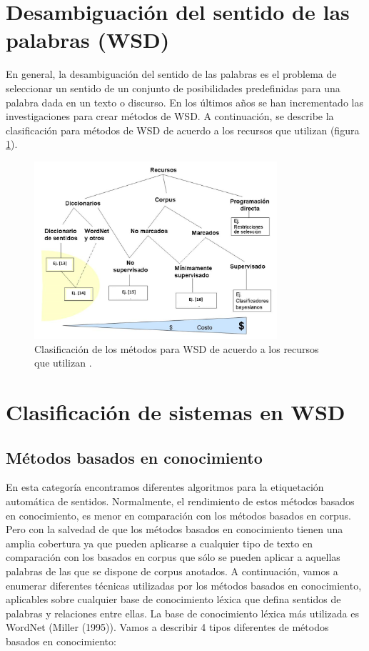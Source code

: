 \section{Desambiguación del sentido de las palabras (WSD)}
En general, la desambiguación del sentido de las palabras es el problema de seleccionar un sentido de un conjunto de posibilidades predefinidas para una palabra dada en un texto o discurso.
En los últimos años se han incrementado las investigaciones para crear métodos de WSD. A continuación, se describe la clasificación para métodos de WSD de acuerdo a los recursos que utilizan (figura \ref{fig:desambiguacion_WSD}).

  \begin{figure}[h!]
	  \begin{center}
    \includegraphics[angle=0, width=9cm]{Graficos/desambiguacion_WSD}
	  \caption{Clasificación de los métodos para WSD de acuerdo a los recursos que utilizan \cite{001}.}
    \label{fig:desambiguacion_WSD}
    \end{center}
	\end{figure}

\section{Clasificación de sistemas en WSD}
\subsection{Métodos basados en conocimiento}
En esta categoría encontramos diferentes algoritmos para la etiquetación automática de sentidos. Normalmente, el rendimiento de estos métodos basados en conocimiento, es menor en comparación con los métodos basados en corpus. Pero con la salvedad de que los métodos basados en conocimiento tienen una amplia cobertura ya que pueden aplicarse a cualquier tipo de texto en comparación con los basados en corpus que sólo se pueden aplicar a aquellas palabras de las que se dispone de corpus anotados. A continuación, vamos a enumerar diferentes técnicas utilizadas por los métodos basados en conocimiento, aplicables sobre cualquier base de conocimiento léxica que defina sentidos de palabras y relaciones entre ellas. La base de conocimiento léxica más utilizada es WordNet (Miller (1995)). Vamos a describir 4 tipos diferentes de métodos basados en conocimiento:

